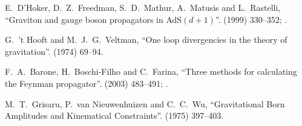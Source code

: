 \begin{thebibliography}{99}
E.~D'Hoker, D.~Z.~Freedman, S.~D.~Mathur, A.~Matusis and L.~Rastelli,
``Graviton and gauge boson propagators in AdS$(d+1)$''.
  (1999) 330--352;
.\newline
{\tt{}}

G.~'t Hooft and M.~J.~G.~Veltman,
``One loop divergencies in the theory of gravitation''.
  (1974) 69--94.

F.~A.~Barone, H.~Boschi-Filho and C.~Farina,
``Three methods for calculating the Feynman propagator''.
  (2003) 483--491; .\newline
{\tt{}}

M.~T.~Grisaru, P.~van Nieuwenhuizen and C.~C.~Wu,
``Gravitational Born Amplitudes and Kinematical Constraints''.
  (1975) 397--403.\newline
{\tt{}}

\end{thebibliography}
